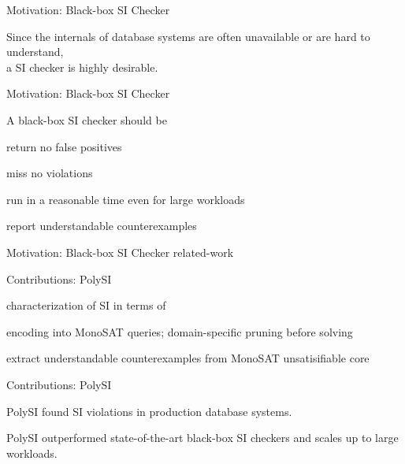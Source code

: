 \begin{frame}{Motivation: Black-box SI Checker}
  \begin{center}
    Since the internals of database systems are often unavailable
    or are hard to understand, \\[6pt]
    a  SI checker is highly desirable.
  \end{center}
\end{frame}

\begin{frame}{Motivation: Black-box SI Checker}
  \begin{center}
    A black-box SI checker should be \\[8pt]
    \begin{description}
      \setlength{\itemsep}{6pt}
      \item[Sound:] return no false positives
      \item[Complete:] miss no violations
      \item[Efficient:] run in a reasonable time even for large workloads
      \item[Informative:] report understandable counterexamples
    \end{description}
  \end{center}
\end{frame}

\begin{frame}{Motivation: Black-box SI Checker}
  related-work
\end{frame}

\begin{frame}{Contributions: PolySI}
  \begin{description}
    \setlength{\itemsep}{6pt}
    \item[Sound \& Complete:] characterization of SI in terms of 
    \item[Efficient:] encoding into MonoSAT queries;
      domain-specific pruning before solving
    \item[Informative:] extract understandable counterexamples from MonoSAT unsatisifiable core
  \end{description}
\end{frame}

\begin{frame}{Contributions: PolySI}
  \begin{center}
    PolySI found SI violations in production database systems.

    \vspace{0.80cm}
    PolySI outperformed state-of-the-art black-box SI checkers
    and scales up to large workloads.
  \end{center}
\end{frame}
